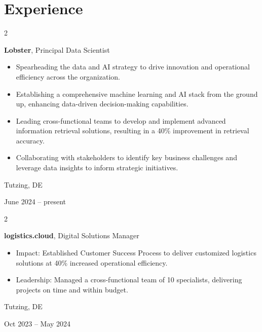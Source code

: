 \documentclass[10pt, a4paper]{article}
\newenvironment{highlights}{
    \begin{itemize}[
        topsep=0.10 cm,
        parsep=0.10 cm,
        partopsep=0pt,
        itemsep=0pt,
        leftmargin=0.4 cm + 10pt
    ]
}{
    \end{itemize}
} %
\newenvironment{twocolentry}[2][]{
    \onecolentry
    \def\secondColumn{#2}
    \setcolumnwidth{\fill, 4.5 cm}
    \begin{paracol}{2}
}{
    \switchcolumn \raggedleft \secondColumn
    \end{paracol}
    \endonecolentry
} %
\begin{document}
    
    \section{Experience}



        
        \begin{twocolentry}{
            Tutzing, DE

        June 2024 – present
        }
            \textbf{Lobster}, Principal Data Scientist
            \begin{highlights}
                \item Spearheading the data and AI strategy to drive innovation and operational efficiency across the organization.
                \item Establishing a comprehensive machine learning and AI stack from the ground up, enhancing data-driven decision-making capabilities.
                \item Leading cross-functional teams to develop and implement advanced information retrieval solutions, resulting in a 40\% improvement in retrieval accuracy.
                \item Collaborating with stakeholders to identify key business challenges and leverage data insights to inform strategic initiatives.
            \end{highlights}
        \end{twocolentry}


        \vspace{0.2 cm}

        \begin{twocolentry}{
            Tutzing, DE

        Oct 2023 – May 2024
        }
            \textbf{logistics.cloud}, Digital Solutions Manager
            \begin{highlights}
                \item Impact: Established Customer Success Process to deliver customized logistics solutions at 40\% increased operational efficiency.
                \item Leadership: Managed a cross-functional team of 10 specialists, delivering projects on time and within budget.
            \end{highlights}
        \end{twocolentry}


        \vspace{0.2 cm}
\end{document}
